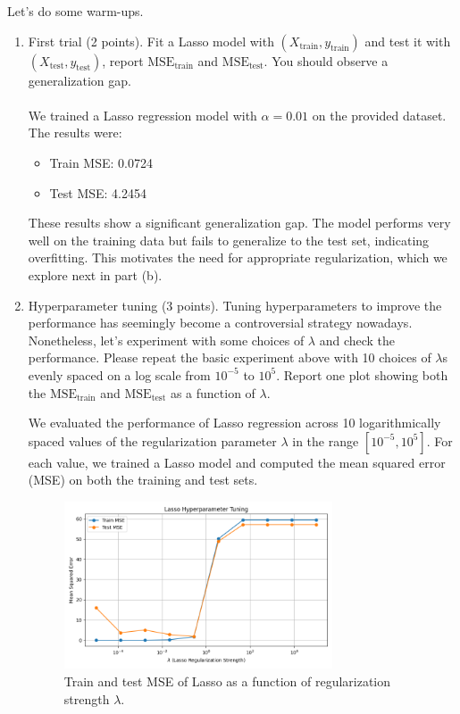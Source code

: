 \documentclass{article}
\begin{document}
Let's do some warm-ups.
\begin{enumerate}[label=(\alph*)]
\item First trial (2 points). Fit a Lasso model with $(X_{\text{train}}, y_{\text{train}})$ and test it with $(X_{\text{test}}, y_{\text{test}})$, report
$\text{MSE}_{\text{train}}$ and $\text{MSE}_{\text{test}}$. You should observe a generalization gap.\\\\We trained a Lasso regression model with \( \alpha = 0.01 \) on the provided dataset. The results were:

\begin{itemize}
    \item Train MSE: 0.0724
    \item Test MSE: 4.2454
\end{itemize}

These results show a significant generalization gap. The model performs very well on the training data but fails to generalize to the test set, indicating overfitting. This motivates the need for appropriate regularization, which we explore next in part (b).


\item Hyperparameter tuning (3 points). Tuning hyperparameters to improve the performance has seemingly
become a controversial strategy nowadays. Nonetheless, let's experiment with some choices of $\lambda$ and
check the performance. Please repeat the basic experiment above with 10 choices of $\lambda$s evenly spaced
on a log scale from $10^{-5}$ to $10^5$. Report one plot showing both the $\text{MSE}_{\text{train}}$ and $\text{MSE}_{\text{test}}$ as a function
of $\lambda$.


We evaluated the performance of Lasso regression across 10 logarithmically spaced values of the regularization parameter \( \lambda \) in the range \([10^{-5}, 10^5]\). For each value, we trained a Lasso model and computed the mean squared error (MSE) on both the training and test sets.

\begin{figure}[H]
    \centering
    \includegraphics[width=0.75\textwidth]{lasso_mse_vs_lambda.png}
    \caption{Train and test MSE of Lasso as a function of regularization strength \( \lambda \).}
\end{figure}


\end{enumerate}
\end{document}
